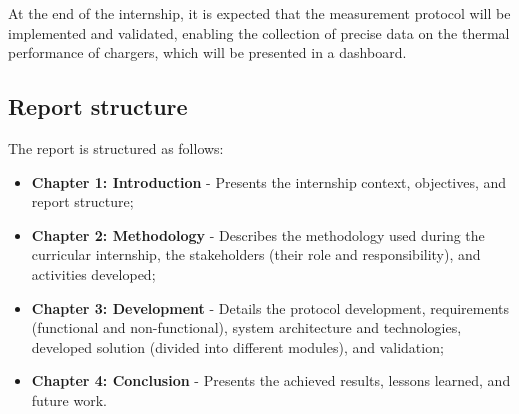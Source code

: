 At the end of the internship, it is expected that the measurement protocol will be implemented and validated, enabling the collection of precise data on 
the thermal performance of chargers, which will be presented in a dashboard.

\subsection{Report structure}
The report is structured as follows:
\begin{itemize}
    \item \textbf{Chapter 1: Introduction} - Presents the internship context, objectives, and report structure;
    \item \textbf{Chapter 2: Methodology} - Describes the methodology used during the curricular internship, the stakeholders (their role and responsibility), and activities developed;
    \item \textbf{Chapter 3: Development} - Details the protocol development, requirements (functional and non-functional), system architecture and technologies, developed solution (divided into different modules), and validation;
    \item \textbf{Chapter 4: Conclusion} - Presents the achieved results, lessons learned, and future work.
\end{itemize}